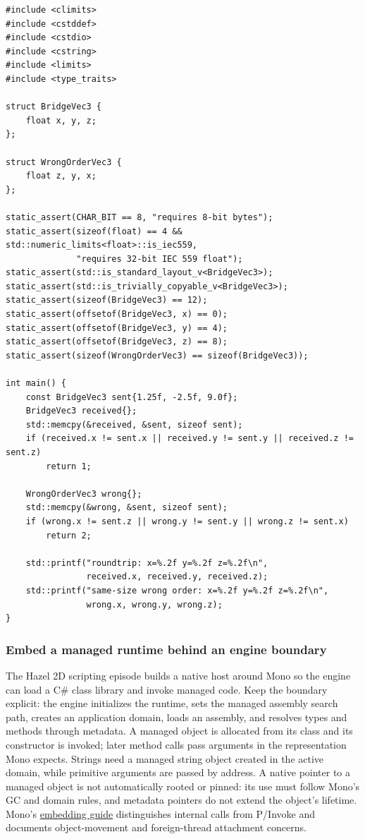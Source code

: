 \begin{verbatim}
#include <climits>
#include <cstddef>
#include <cstdio>
#include <cstring>
#include <limits>
#include <type_traits>

struct BridgeVec3 {
    float x, y, z;
};

struct WrongOrderVec3 {
    float z, y, x;
};

static_assert(CHAR_BIT == 8, "requires 8-bit bytes");
static_assert(sizeof(float) == 4 && std::numeric_limits<float>::is_iec559,
              "requires 32-bit IEC 559 float");
static_assert(std::is_standard_layout_v<BridgeVec3>);
static_assert(std::is_trivially_copyable_v<BridgeVec3>);
static_assert(sizeof(BridgeVec3) == 12);
static_assert(offsetof(BridgeVec3, x) == 0);
static_assert(offsetof(BridgeVec3, y) == 4);
static_assert(offsetof(BridgeVec3, z) == 8);
static_assert(sizeof(WrongOrderVec3) == sizeof(BridgeVec3));

int main() {
    const BridgeVec3 sent{1.25f, -2.5f, 9.0f};
    BridgeVec3 received{};
    std::memcpy(&received, &sent, sizeof sent);
    if (received.x != sent.x || received.y != sent.y || received.z != sent.z)
        return 1;

    WrongOrderVec3 wrong{};
    std::memcpy(&wrong, &sent, sizeof sent);
    if (wrong.x != sent.z || wrong.y != sent.y || wrong.z != sent.x)
        return 2;

    std::printf("roundtrip: x=%.2f y=%.2f z=%.2f\n",
                received.x, received.y, received.z);
    std::printf("same-size wrong order: x=%.2f y=%.2f z=%.2f\n",
                wrong.x, wrong.y, wrong.z);
}
\end{verbatim}

\subsubsection{Embed a managed runtime behind an engine boundary}\label{06-engine-ii-ch040-embed-a-managed-runtime-behind-an-engine-boundary}

\hypertarget{06-engine-ii-ch040-embed-a-managed-runtime-behind-an-engine-boundary}{}

The Hazel 2D scripting episode builds a native host around Mono so the engine can load a C\# class library and invoke managed code. Keep the boundary explicit: the engine initializes the runtime, sets the managed assembly search path, creates an application domain, loads an assembly, and resolves types and methods through metadata. A managed object is allocated from its class and its constructor is invoked; later method calls pass arguments in the representation Mono expects. Strings need a managed string object created in the active domain, while primitive arguments are passed by address. A native pointer to a managed object is not automatically rooted or pinned: its use must follow Mono's GC and domain rules, and metadata pointers do not extend the object's lifetime. Mono's \href{https://www.mono-project.com/docs/advanced/embedding/}{embedding guide} distinguishes internal calls from P/Invoke and documents object-movement and foreign-thread attachment concerns.

